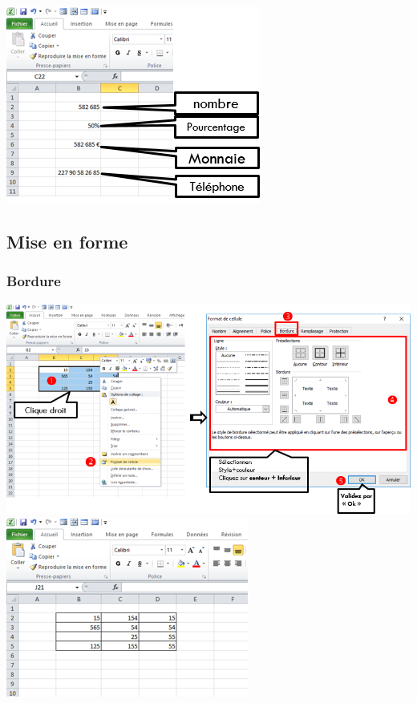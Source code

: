 \begin{center}  
	\includegraphics[scale=0.2,width=0.7 \linewidth]{img/exemple_format}
\end{center}

\subsection{Mise en forme}
\subsubsection{Bordure}
\begin{center}  
	\includegraphics[scale=0.2,width=0.9 \linewidth]{img/bordure_cellule}
		\includegraphics[scale=0.2,width=0.9 \linewidth]{img/tableau_bordure}
\end{center}
